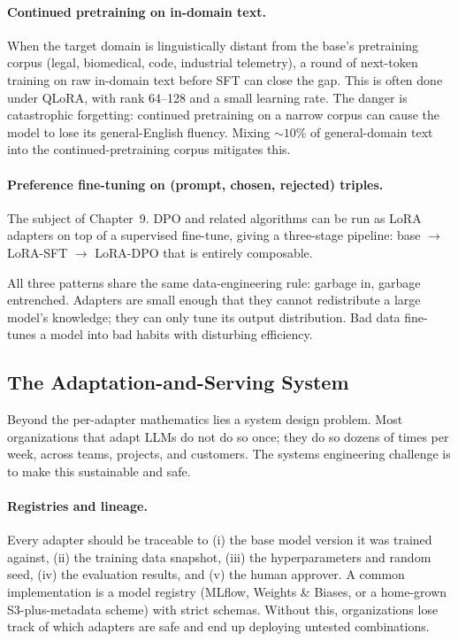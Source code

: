 \paragraph{Continued pretraining on in-domain text.} When the target
domain is linguistically distant from the base's pretraining corpus
(legal, biomedical, code, industrial telemetry), a round of
next-token training on raw in-domain text before SFT can close the
gap. This is often done under QLoRA, with rank 64--128 and a small
learning rate. The danger is catastrophic forgetting: continued
pretraining on a narrow corpus can cause the model to lose its
general-English fluency. Mixing $\sim 10\%$ of general-domain text
into the continued-pretraining corpus mitigates this.

\paragraph{Preference fine-tuning on (prompt, chosen, rejected)
triples.} The subject of Chapter~9. DPO \citep{rafailov2023direct} and
related algorithms can be run as LoRA adapters on top of a
supervised fine-tune, giving a three-stage pipeline: base $\to$
LoRA-SFT $\to$ LoRA-DPO that is entirely composable.

All three patterns share the same data-engineering rule: garbage in,
garbage entrenched. Adapters are small enough that they cannot
redistribute a large model's knowledge; they can only tune its
output distribution. Bad data fine-tunes a model into bad habits
with disturbing efficiency.

\subsection{The Adaptation-and-Serving System}

Beyond the per-adapter mathematics lies a system design problem.
Most organizations that adapt LLMs do not do so once; they do so
dozens of times per week, across teams, projects, and customers. The
systems engineering challenge is to make this sustainable and safe.

\paragraph{Registries and lineage.} Every adapter should be traceable
to (i) the base model version it was trained against, (ii) the
training data snapshot, (iii) the hyperparameters and random seed,
(iv) the evaluation results, and (v) the human approver. A common
implementation is a model registry (MLflow, Weights \& Biases, or a
home-grown S3-plus-metadata scheme) with strict schemas. Without
this, organizations lose track of which adapters are safe and end up
deploying untested combinations.

